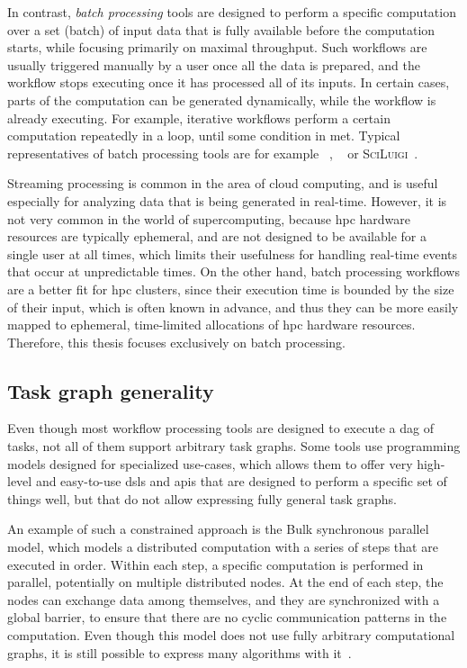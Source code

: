 In contrast, \emph{batch processing} tools are designed to perform a specific computation over a
set (batch) of input data that is fully available before the computation starts, while focusing
primarily on maximal throughput. Such workflows are usually triggered manually by a user once all
the data is prepared, and the workflow stops executing once it has processed all of its inputs. In
certain cases, parts of the computation can be generated dynamically, while the workflow is already
executing. For example, iterative workflows perform a certain computation repeatedly in a loop,
until some condition in met. Typical representatives of batch processing tools are for example
\dask{}~\cite{dask}, \snakemake{}~\cite{snakemake} or
\textsc{SciLuigi}~\cite{sciluigi}.

Streaming processing is common in the area of cloud computing, and is useful especially for
analyzing data that is being generated in real-time. However, it is not very common in the world of
supercomputing, because \gls{hpc} hardware resources are typically ephemeral, and are
not designed to be available for a single user at all times, which limits their usefulness for
handling real-time events that occur at unpredictable times. On the other hand, batch processing
workflows are a better fit for \gls{hpc} clusters, since their execution time is
bounded by the size of their input, which is often known in advance, and thus they can be more
easily mapped to ephemeral, time-limited allocations of \gls{hpc} hardware resources.
Therefore, this thesis focuses exclusively on batch processing.

\subsection{Task graph generality}
Even though most workflow processing tools are designed to execute a \gls{dag} of
tasks, not all of them support arbitrary task graphs. Some tools use programming models designed
for specialized use-cases, which allows them to offer very high-level and easy-to-use
\glspl{dsl} and \glspl{api} that are designed to perform a specific set of
things well, but that do not allow expressing fully general task graphs.

An example of such a constrained approach is the Bulk synchronous parallel~\cite{bulkparallel1}
model, which models a distributed computation with a series of steps that are executed in order.
Within each step, a specific computation is performed in parallel, potentially on multiple
distributed nodes. At the end of each step, the nodes can exchange data among themselves, and they
are synchronized with a global barrier, to ensure that there are no cyclic communication patterns
in the computation. Even though this model does not use fully arbitrary computational graphs, it is
still possible to express many algorithms with it~\cite{bulkparallel2}.


